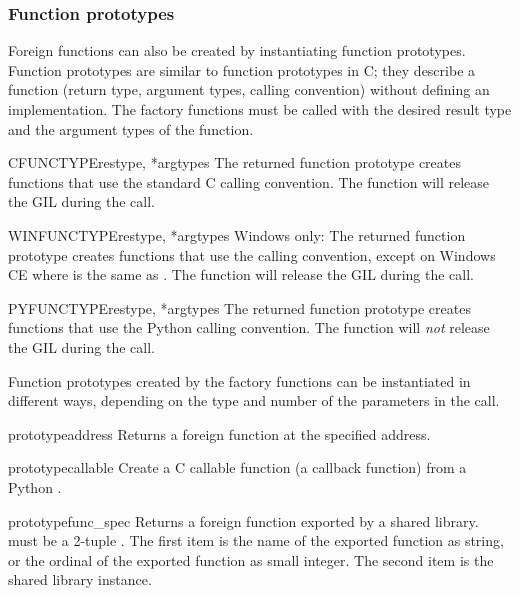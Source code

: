 \subsubsection{Function prototypes\label{ctypes-function-prototypes}}

Foreign functions can also be created by instantiating function
prototypes.  Function prototypes are similar to function prototypes in
C; they describe a function (return type, argument types, calling
convention) without defining an implementation.  The factory
functions must be called with the desired result type and the argument
types of the function.

\begin{funcdesc}{CFUNCTYPE}{restype, *argtypes}
The returned function prototype creates functions that use the
standard C calling convention.  The function will release the GIL
during the call.
\end{funcdesc}

\begin{funcdesc}{WINFUNCTYPE}{restype, *argtypes}
Windows only: The returned function prototype creates functions
that use the  calling convention, except on Windows CE
where  is the same as .  The function
will release the GIL during the call.
\end{funcdesc}

\begin{funcdesc}{PYFUNCTYPE}{restype, *argtypes}
The returned function prototype creates functions that use the
Python calling convention.  The function will \emph{not} release the
GIL during the call.
\end{funcdesc}

Function prototypes created by the factory functions can be
instantiated in different ways, depending on the type and number of
the parameters in the call.

\begin{funcdescni}{prototype}{address}
Returns a foreign function at the specified address.
\end{funcdescni}

\begin{funcdescni}{prototype}{callable}
Create a C callable function (a callback function) from a Python
.
\end{funcdescni}

\begin{funcdescni}{prototype}{func_spec}
Returns a foreign function exported by a shared library.
 must be a 2-tuple .
The first item is the name of the exported function as string, or
the ordinal of the exported function as small integer.  The second
item is the shared library instance.
\end{funcdescni}

